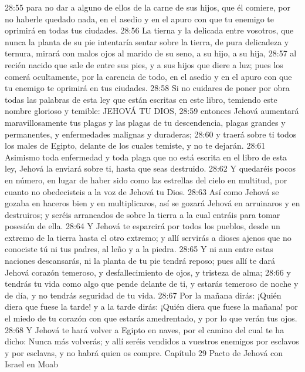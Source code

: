 28:55 para no dar a alguno de ellos de la carne de sus hijos, que él comiere, por no haberle quedado nada, en el asedio y en el apuro con que tu enemigo te oprimirá en todas tus ciudades.  
28:56 La tierna y la delicada entre vosotros, que nunca la planta de su pie intentaría sentar sobre la tierra, de pura delicadeza y ternura, mirará con malos ojos al marido de su seno, a su hijo, a su hija,  
28:57 al recién nacido que sale de entre sus pies, y a sus hijos que diere a luz; pues los comerá ocultamente, por la carencia de todo, en el asedio y en el apuro con que tu enemigo te oprimirá en tus ciudades.  
28:58 Si no cuidares de poner por obra todas las palabras de esta ley que están escritas en este libro, temiendo este nombre glorioso y temible: JEHOVÁ TU DIOS,  
28:59 entonces Jehová aumentará maravillosamente tus plagas y las plagas de tu descendencia, plagas grandes y permanentes, y enfermedades malignas y duraderas;  
28:60 y traerá sobre ti todos los males de Egipto, delante de los cuales temiste, y no te dejarán.  
28:61 Asimismo toda enfermedad y toda plaga que no está escrita en el libro de esta ley, Jehová la enviará sobre ti, hasta que seas destruido.  
28:62 Y quedaréis pocos en número, en lugar de haber sido como las estrellas del cielo en multitud, por cuanto no obedecisteis a la voz de Jehová tu Dios.  
28:63 Así como Jehová se gozaba en haceros bien y en multiplicaros, así se gozará Jehová en arruinaros y en destruiros; y seréis arrancados de sobre la tierra a la cual entráis para tomar posesión de ella.  
28:64 Y Jehová te esparcirá por todos los pueblos, desde un extremo de la tierra hasta el otro extremo; y allí servirás a dioses ajenos que no conociste tú ni tus padres, al leño y a la piedra.  
28:65 Y ni aun entre estas naciones descansarás, ni la planta de tu pie tendrá reposo; pues allí te dará Jehová corazón temeroso, y desfallecimiento de ojos, y tristeza de alma;  
28:66 y tendrás tu vida como algo que pende delante de ti, y estarás temeroso de noche y de día, y no tendrás seguridad de tu vida.  
28:67 Por la mañana dirás: ¡Quién diera que fuese la tarde! y a la tarde dirás: ¡Quién diera que fuese la mañana! por el miedo de tu corazón con que estarás amedrentado, y por lo que verán tus ojos.  
28:68 Y Jehová te hará volver a Egipto en naves, por el camino del cual te ha dicho: Nunca más volverás; y allí seréis vendidos a vuestros enemigos por esclavos y por esclavas, y no habrá quien os compre.  
Capítulo 29 
Pacto de Jehová con Israel en Moab  

